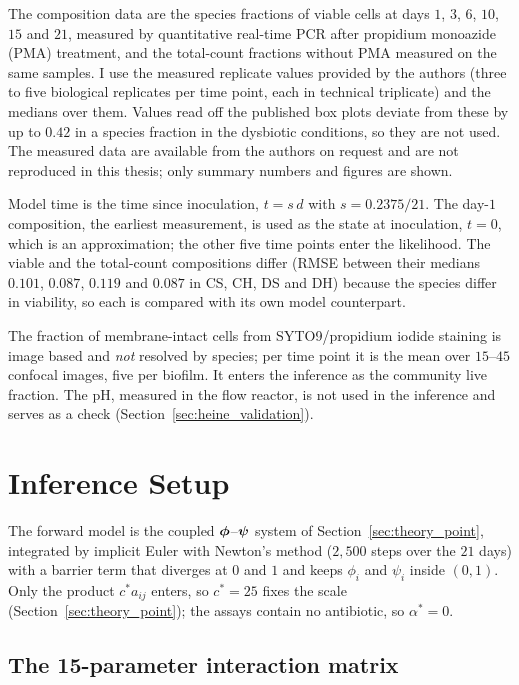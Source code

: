 The composition data are the species fractions of viable cells at days $1$, $3$,
$6$, $10$, $15$ and $21$, measured by quantitative real-time PCR after propidium
monoazide (PMA) treatment, and the total-count fractions without PMA measured on
the same samples. I use the measured replicate values provided by the authors
(three to five biological replicates per time point, each in technical
triplicate) and the medians over them. Values read off the published box plots
deviate from these by up to $0.42$ in a species fraction in the dysbiotic
conditions, so they are not used. The measured data are available from the
authors on request and are not reproduced in this thesis; only summary numbers
and figures are shown.

Model time is the time since inoculation, $t=s\,d$ with $s=0.2375/21$. The
day-$1$ composition, the earliest measurement, is used as the state at
inoculation, $t=0$, which is an approximation; the other five time points enter
the likelihood. The
viable and the total-count compositions differ (RMSE between their medians
$0.101$, $0.087$, $0.119$ and $0.087$ in CS, CH, DS and DH) because the species
differ in viability, so each is compared with its own model counterpart.

The fraction of membrane-intact cells from SYTO9/propidium iodide staining is
image based and \emph{not} resolved by species; per time point it is the mean
over $15$--$45$ confocal images, five per biofilm. It enters the inference as the
community live fraction. The pH, measured in the flow reactor, is not used in
the inference and serves as a check (Section~\ref{sec:heine_validation}).

\section{Inference Setup}
\label{sec:heine_setup}

The forward model is the coupled $\boldsymbol{\phi}$--$\boldsymbol{\psi}$ system of
Section~\ref{sec:theory_point}, integrated by implicit Euler with Newton's
method ($2{,}500$ steps over the $21$ days) with a barrier term that diverges at $0$ and $1$ and keeps
$\phi_i$ and $\psi_i$ inside $(0,1)$. Only the product $c^*a_{ij}$ enters, so
$c^*=25$ fixes the scale (Section~\ref{sec:theory_point}); the assays
contain no antibiotic, so $\alpha^*=0$.

\subsection{The 15-parameter interaction matrix}
\label{sec:heine_matrix}

